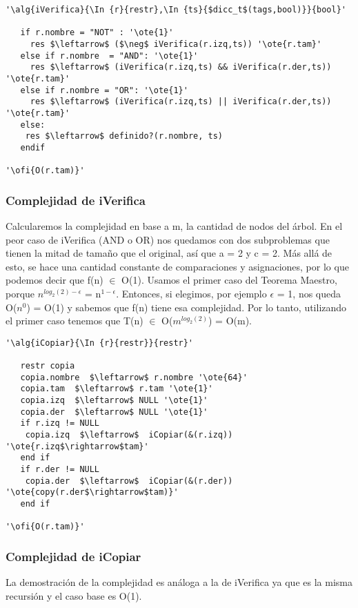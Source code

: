 \begin{lstlisting}[mathescape]
'\alg{iVerifica}{\In {r}{restr},\In {ts}{$dicc_t$(tags,bool)}}{bool}'
    
   if r.nombre = "NOT" : '\ote{1}'
     res $\leftarrow$ ($\neg$ iVerifica(r.izq,ts)) '\ote{r.tam}'
   else if r.nombre  = "AND": '\ote{1}'
     res $\leftarrow$ (iVerifica(r.izq,ts) && iVerifica(r.der,ts)) '\ote{r.tam}'
   else if r.nombre = "OR": '\ote{1}'
     res $\leftarrow$ (iVerifica(r.izq,ts) || iVerifica(r.der,ts)) '\ote{r.tam}'
   else:
    res $\leftarrow$ definido?(r.nombre, ts)
   endif
       
'\ofi{O(r.tam)}'
\end{lstlisting}

\subsubsection{Complejidad de iVerifica}
Calcularemos la complejidad en base a m, la cantidad de nodos del \'arbol. 
En el peor caso de iVerifica (AND o OR) nos quedamos con dos subproblemas que tienen la mitad de tama\~no que el original, as\'i que
a = 2 y c = 2.
M\'as all\'a de esto, se hace una cantidad constante de comparaciones y asignaciones, por lo que podemos decir que f(n) $\in$ O(1).
Usamos el primer caso del Teorema Maestro, porque $n^{log_2(2)-\epsilon}$ = n$^{1-\epsilon}$. Entonces, si elegimos, por ejemplo
$\epsilon$ = 1, nos queda O($n^0$) = O(1) y sabemos que f(n) tiene esa complejidad.
Por lo tanto, utilizando el primer caso tenemos que T(n) $\in$ O($m^{log_2(2)}$) = O(m).

\begin{lstlisting}[mathescape]
'\alg{iCopiar}{\In {r}{restr}}{restr}'
    
   restr copia
   copia.nombre  $\leftarrow$ r.nombre '\ote{64}'
   copia.tam  $\leftarrow$ r.tam '\ote{1}'
   copia.izq  $\leftarrow$ NULL '\ote{1}'
   copia.der  $\leftarrow$ NULL '\ote{1}'
   if r.izq != NULL
    copia.izq  $\leftarrow$  iCopiar(&(r.izq)) '\ote{r.izq$\rightarrow$tam}'
   end if
   if r.der != NULL
    copia.der  $\leftarrow$  iCopiar(&(r.der)) '\ote{copy(r.der$\rightarrow$tam)}'
   end if 
       
'\ofi{O(r.tam)}'
\end{lstlisting}

\subsubsection{Complejidad de iCopiar}
La demostraci\'on de la complejidad es an\'aloga a la de iVerifica ya que es la misma recursi\'on y el caso base es O(1).




